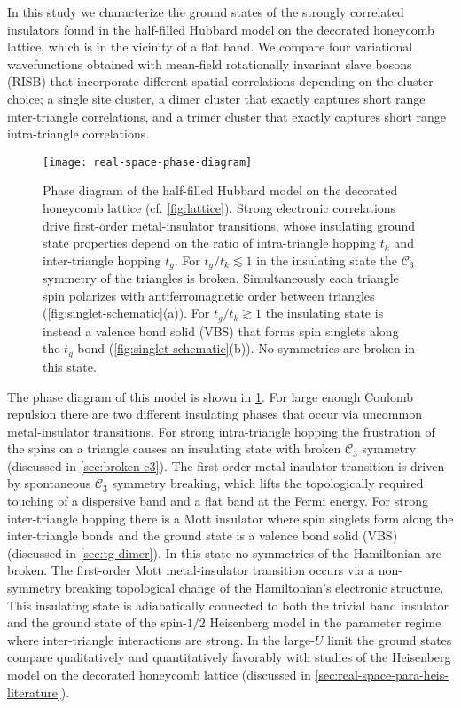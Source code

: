\documentclass[reprint,aps,prb,amsmath,amssymb]{revtex4-2}
\begin{document}
In this study we characterize the ground states of the strongly correlated insulators found in the half-filled Hubbard model on the decorated honeycomb lattice, which is in the vicinity of a flat band. We compare four variational wavefunctions obtained with mean-field rotationally invariant slave bosons (RISB) that incorporate different spatial correlations depending on the cluster choice; a single site cluster, a dimer cluster that exactly captures short range inter-triangle correlations, and a trimer cluster that exactly captures short range intra-triangle correlations. 

\begin{figure}
	\centering
	\texttt{[image: real-space-phase-diagram]}
	\caption
	{\label{fig:phase-diagram}
		Phase diagram of the half-filled Hubbard model on the decorated honeycomb lattice (cf. \cref{fig:lattice}). Strong electronic correlations drive first-order metal-insulator transitions, whose insulating ground state properties depend on the ratio of intra-triangle hopping $t_k$ and inter-triangle hopping $t_g$. For $t_g/t_k \lesssim 1$ in the insulating state the $\mathcal{C}_3$ symmetry of the triangles is broken. Simultaneously each triangle spin polarizes with antiferromagnetic order between triangles (\cref{fig:singlet-schematic}(a)). For $t_g/t_k \gtrsim 1$ the insulating state is instead a valence bond solid (VBS) that forms spin singlets along the $t_g$ bond (\cref{fig:singlet-schematic}(b)). No symmetries are broken in this state.
	}
\end{figure}

The phase diagram of this model is shown in \cref{fig:phase-diagram}. For large enough Coulomb repulsion there are two different insulating phases that occur via uncommon metal-insulator transitions. For strong intra-triangle hopping the frustration of the spins on a triangle causes an insulating state with broken $\mathcal{C}_3$ symmetry (discussed in \cref{sec:broken-c3}). The first-order metal-insulator transition is driven by spontaneous $\mathcal{C}_3$ symmetry breaking, which lifts the topologically required touching of a dispersive band and a flat band at the Fermi energy.
%
For strong inter-triangle hopping there is a Mott insulator where spin singlets form along the inter-triangle bonds and the ground state is a valence bond solid (VBS) (discussed in \cref{sec:tg-dimer}). In this state no symmetries of the Hamiltonian are broken. The first-order Mott metal-insulator transition occurs via a non-symmetry breaking topological change of the Hamiltonian's electronic structure.
%
This insulating state is adiabatically connected to both the trivial band insulator and the ground state of the spin-$1/2$ Heisenberg model in the parameter regime where inter-triangle interactions are strong. 
%
In the large-$U$ limit the ground states compare qualitatively and quantitatively favorably with studies of the Heisenberg model on the decorated honeycomb lattice \cite{Richter2004,Misguich2007,Yang2010,Jahromi2018} (discussed in \cref{sec:real-space-para-heis-literature}).
\end{document}
